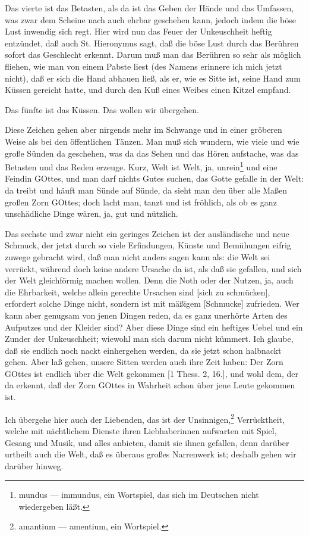 Das vierte ist das Betasten, als da ist das Geben der Hände und das Umfassen, was zwar dem Scheine nach auch ehrbar geschehen kann, jedoch indem die böse Lust inwendig sich regt. Hier wird nun das Feuer der Unkeuschheit heftig entzündet, daß auch St. Hieronymus sagt, daß die böse Lust durch das Berühren sofort das Geschlecht erkennt. Darum muß man das Berühren so sehr als möglich fliehen, wie man von einem Pabste liest (des Namens erinnere ich mich jetzt nicht), daß er sich die Hand abhauen ließ, als er, wie es Sitte ist, seine Hand zum Küssen gereicht hatte, und durch den Kuß eines Weibes einen Kitzel empfand.

Das fünfte ist das Küssen. Das wollen wir übergehen.

Diese Zeichen gehen aber nirgends mehr im Schwange und in einer gröberen Weise als bei den öffentlichen Tänzen. Man muß sich wundern, wie viele und wie große Sünden da geschehen, was da das Sehen und das Hören aufstache, was das Betasten und das Reden erzeuge. Kurz, Welt ist Welt, ja, unrein\footnote{mundus — immundus, ein Wortspiel, das sich im Deutschen nicht wiedergeben läßt.} und eine Feindin GOttes, und man darf nichts Gutes suchen, das Gotte gefalle in der Welt: da treibt und häuft man Sünde auf Sünde, da sieht man den über alle Maßen großen Zorn GOttes; doch lacht man, tanzt und ist fröhlich, als ob es ganz unschädliche Dinge wären, ja, gut und nützlich.

Das sechste und zwar nicht ein geringes Zeichen ist der ausländische und neue Schmuck, der jetzt durch so viele Erfindungen, Künste und Bemühungen eifrig zuwege gebracht wird, daß man nicht anders sagen kann als: die Welt sei verrückt, während doch keine andere Ursache da ist, als daß sie gefallen, und sich der Welt gleichförmig machen wollen. Denn die Noth oder der Nutzen, ja, auch die Ehrbarkeit, welche allein gerechte Ursachen sind [sich zu schmücken], erfordert solche Dinge nicht, sondern ist mit mäßigem [Schmucke] zufrieden. Wer kann aber genugsam von jenen Dingen reden, da es ganz unerhörte Arten des Aufputzes und der Kleider sind? Aber diese Dinge sind ein heftiges Uebel und ein Zunder der Unkeuschheit; wiewohl man sich darum nicht kümmert. Ich glaube, daß sie endlich noch nackt einhergehen werden, da sie jetzt schon halbnackt gehen. Aber laß gehen, unsere Sitten werden auch ihre Zeit haben: Der Zorn GOttes ist endlich über die Welt gekommen [1 Thess. 2, 16.], und wohl dem, der da erkennt, daß der Zorn GOttes in Wahrheit schon über jene Leute gekommen ist.

Ich übergehe hier auch der Liebenden, das ist der Unsinnigen,\footnote{amantium — amentium, ein Wortspiel.} Verrücktheit, welche mit nächtlichem Dienste ihren Liebhaberinnen aufwarten mit Spiel, Gesang und Musik, und alles anbieten, damit sie ihnen gefallen, denn darüber urtheilt auch die Welt, daß es überaus großes Narrenwerk ist; deshalb gehen wir darüber hinweg.

